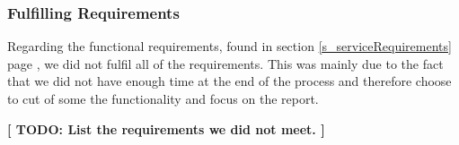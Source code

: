 \subsubsection{Fulfilling Requirements}
Regarding the functional requirements, found in section \ref{s_serviceRequirements} page \pageref{s_serviceRequirements}, we did not fulfil all of the requirements. This was mainly due to the fact that we did not have enough time at the end of the process and therefore choose to cut of some the functionality and focus on the report.

\textbf{[ TODO: List the requirements we did not meet. ]}